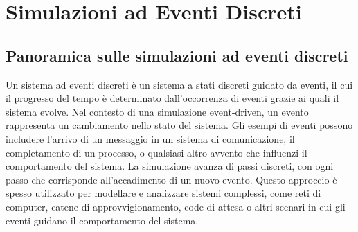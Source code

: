 \documentclass[12pt,a4paper,openright,twoside]{book}
\begin{document}





% 


\chapter{Simulazioni ad Eventi Discreti}
\section{Panoramica sulle simulazioni ad eventi discreti}
\label{sec:panoramica-des}
Un sistema ad eventi discreti è un sistema a stati discreti guidato da eventi, il cui il progresso del tempo è determinato dall'occorrenza di eventi grazie ai quali il sistema evolve. Nel contesto di una simulazione event-driven, un evento rappresenta un cambiamento nello stato del sistema. 
Gli esempi di eventi possono includere l'arrivo di un messaggio in un sistema di comunicazione, il completamento di un processo, o qualsiasi altro avvento che influenzi il comportamento del sistema. La simulazione avanza di passi discreti, con ogni passo che corrisponde all'accadimento di un nuovo evento. 
Questo approccio è spesso utilizzato per modellare e analizzare sistemi complessi, come reti di computer, catene di approvvigionamento, code di attesa o altri scenari in cui gli eventi guidano il comportamento del sistema. 
\end{document}
